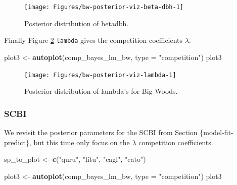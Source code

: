 \documentclass[12pt]{article}
\newenvironment{Shaded}{\begin{snugshade}}{\end{snugshade}}
\newcommand{\DataTypeTok}[1]{\textcolor[rgb]{0.13,0.29,0.53}{#1}}
\newcommand{\KeywordTok}[1]{\textcolor[rgb]{0.13,0.29,0.53}{\textbf{#1}}}
\newcommand{\NormalTok}[1]{#1}
\newcommand{\StringTok}[1]{\textcolor[rgb]{0.31,0.60,0.02}{#1}}
\begin{document}
\begin{figure}

{\centering \texttt{[image: Figures/bw-posterior-viz-beta-dbh-1]} 

}

\caption{Posterior distribution of betadbh.}\label{fig:bw-posterior-viz-beta-dbh}
\end{figure}

Finally Figure \ref{fig:bw-posterior-viz-lambda} \texttt{lambda} gives
the competition coefficients \(\lambda\).

\begin{Shaded}
\begin{Highlighting}[]
\NormalTok{plot3 <-}\StringTok{ }\KeywordTok{autoplot}\NormalTok{(comp_bayes_lm_bw, }\DataTypeTok{type =} \StringTok{"competition"}\NormalTok{)}
\NormalTok{plot3}
\end{Highlighting}
\end{Shaded}

\begin{figure}

{\centering \texttt{[image: Figures/bw-posterior-viz-lambda-1]} 

}

\caption{Posterior distribution of lambda's for Big Woods.}\label{fig:bw-posterior-viz-lambda}
\end{figure}

\hypertarget{scbi-5}{%
\subsubsection{SCBI}\label{scbi-5}}

We revisit the posterior parameters for the SCBI from Section
\{model-fit-predict\}, but this time only focus on the \(\lambda\)
competition coefficients.

\begin{Shaded}
\begin{Highlighting}[]
\NormalTok{sp_to_plot <-}\StringTok{ }\KeywordTok{c}\NormalTok{(}\StringTok{"quru"}\NormalTok{, }\StringTok{"litu"}\NormalTok{, }\StringTok{"cagl"}\NormalTok{, }\StringTok{"cato"}\NormalTok{)}
\end{Highlighting}
\end{Shaded}

\begin{Shaded}
\begin{Highlighting}[]
\NormalTok{plot3 <-}\StringTok{ }\KeywordTok{autoplot}\NormalTok{(comp_bayes_lm_bw, }\DataTypeTok{type =} \StringTok{"competition"}\NormalTok{)}
\NormalTok{plot3}
\end{Highlighting}
\end{Shaded}
\end{document}
